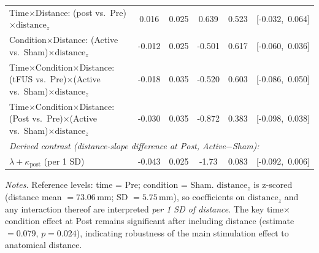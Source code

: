 \begin{table}[t]
\begin{tabular}{lccccc}
    Time$\times$Distance: (post vs.\ Pre)$\times \mathrm{distance}_z$ & 0.016 & 0.025 &  0.639 & 0.523      & [-0.032,\ 0.064] \\
    Condition$\times$Distance: (Active vs.\ Sham)$\times \mathrm{distance}_z$ & -0.012 & 0.025 & -0.501 & 0.617 & [-0.060,\ 0.036] \\
    Time$\times$Condition$\times$Distance: (tFUS vs.\ Pre)$\times$(Active vs.\ Sham)$\times \mathrm{distance}_z$ & -0.018 & 0.035 & -0.520 & 0.603 & [-0.086,\ 0.050] \\
    Time$\times$Condition$\times$Distance: (Post vs.\ Pre)$\times$(Active vs.\ Sham)$\times \mathrm{distance}_z$ & -0.030 & 0.035 & -0.872 & 0.383 & [-0.098,\ 0.038] \\
    \midrule
    \multicolumn{6}{l}{\textit{Derived contrast (distance-slope difference at Post, Active$-$Sham):}} \\
    \multicolumn{1}{l}{\hspace{1em}$\lambda + \kappa_{\mathrm{post}}$ (per 1 SD)} & \multicolumn{1}{c}{ -0.043} & 0.025 & -1.73 & 0.083 & [-0.092,\ 0.006] \\
    \bottomrule
    \end{tabular}
    
    \vspace{4pt}
\footnotesize\textit{Notes.} Reference levels: time = Pre; condition = Sham. $\mathrm{distance}_z$ is z-scored
(distance mean $=73.06$\,mm; SD $=5.75$\,mm), so coefficients on $\mathrm{distance}_z$ and any interaction
thereof are interpreted \emph{per 1 SD of distance}. The key time$\times$condition
effect at Post remains significant after including distance (estimate $=0.079$, $p=0.024$), indicating robustness of the
main stimulation effect to anatomical distance.
\end{table}
